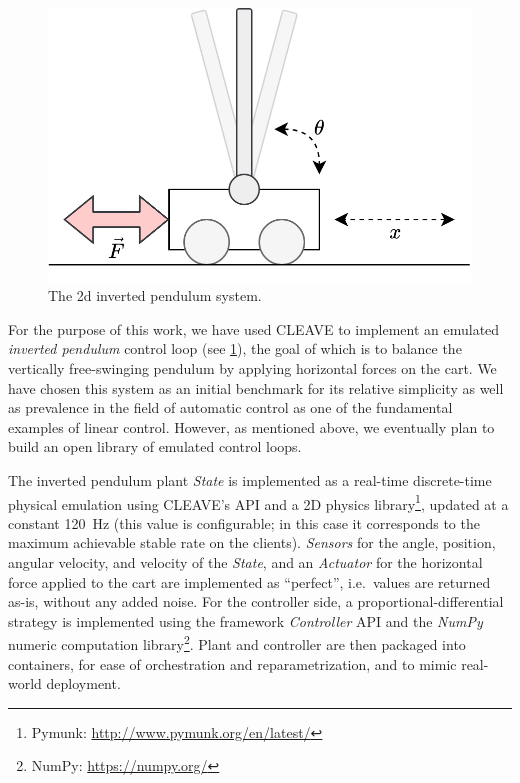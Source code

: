 \begin{figure}
    \centering
    \includegraphics[width=.7\columnwidth]{images/inverted_pendulum.png}
    \caption{
        The 2d inverted pendulum system.
    }\label{fig:invpend}
\end{figure}

For the purpose of this work, we have used \ac{CLEAVE} to implement an emulated \emph{inverted pendulum} control loop (see \cref{fig:invpend}), the goal of which is to balance the vertically free-swinging pendulum by applying horizontal forces on the cart.
We have chosen this system as an initial benchmark for its relative simplicity as well as prevalence in the field of automatic control as one of the fundamental examples of linear control.
However, as mentioned above, we eventually plan to build an open library of emulated control loops.  

The inverted pendulum plant \emph{State} is implemented as a real-time discrete-time physical emulation using CLEAVE's API and a 2D physics library\footnote{Pymunk: \url{http://www.pymunk.org/en/latest/}}, updated at a constant \SI{120}{\hertz} (this value is configurable; in this case it corresponds to the maximum achievable stable rate on the clients).
\emph{Sensors} for the angle, position, angular velocity, and velocity of the \emph{State}, and an \emph{Actuator} for the horizontal force applied to the cart are implemented as ``perfect'', i.e.\ values are returned as-is, without any added noise.
For the controller side, a proportional-differential strategy is implemented using the framework \emph{Controller} API and the \emph{NumPy} numeric computation library\footnote{NumPy: \url{https://numpy.org/}}.
Plant and controller are then packaged into containers, for ease of orchestration and reparametrization, and to mimic real-world deployment.
